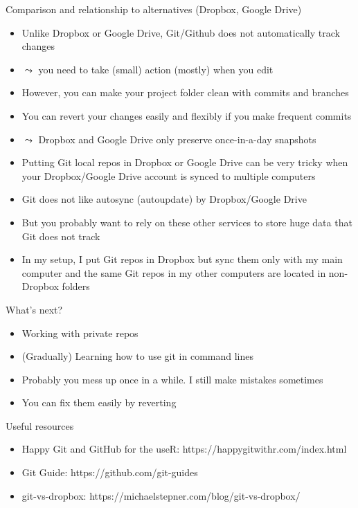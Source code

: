 \documentclass[handout,pdftex,10pt,aspectratio=169]{beamer}
\newcommand{\backupbegin}{
  \newcounter{finalframe}
  \setcounter{finalframe}{\value{framenumber}}
}
\newcommand{\backupend}{
  \setcounter{framenumber}{\value{finalframe}}
}
\begin{document}
\begin{frame}{Comparison and relationship to alternatives (Dropbox, Google Drive)}
  \begin{itemize}[<+->]
    \item Unlike Dropbox or Google Drive, Git/Github does not automatically track changes
    \item[] $\leadsto$ you need to take (small) action (mostly) when you edit
    \item However, you can make your project folder clean with commits and branches
    \item You can revert your changes easily and flexibly if you make frequent commits
    \item[] $\leadsto$ Dropbox and Google Drive only preserve once-in-a-day snapshots
    \bigskip
    \item Putting Git local repos in Dropbox or Google Drive can be very tricky
    when your Dropbox/Google Drive account is synced to multiple computers
    \item Git does not like autosync (autoupdate) by Dropbox/Google Drive
    \item But you probably want to rely on these other services to store huge data that Git does not track
    \item In my setup, I put Git repos in Dropbox but sync them only with my main computer and
      the same Git repos in my other computers are located in non-Dropbox folders
  \end{itemize}
\end{frame}


\begin{frame}{What's next?}
  \begin{itemize}[<+->]
    \item Working with private repos
    \item (Gradually) Learning how to use git in command lines
    \medskip
    \item Probably you mess up once in a while. I still make mistakes sometimes
    \item You can fix them easily by reverting
  \end{itemize}
\end{frame}


\begin{frame}{Useful resources}
  \begin{itemize}
    \item Happy Git and GitHub for the useR: https://happygitwithr.com/index.html
    \item Git Guide: https://github.com/git-guides
    \item git-vs-dropbox: https://michaelstepner.com/blog/git-vs-dropbox/
  \end{itemize}
\end{frame}


\backupbegin
\backupend
\end{document}
